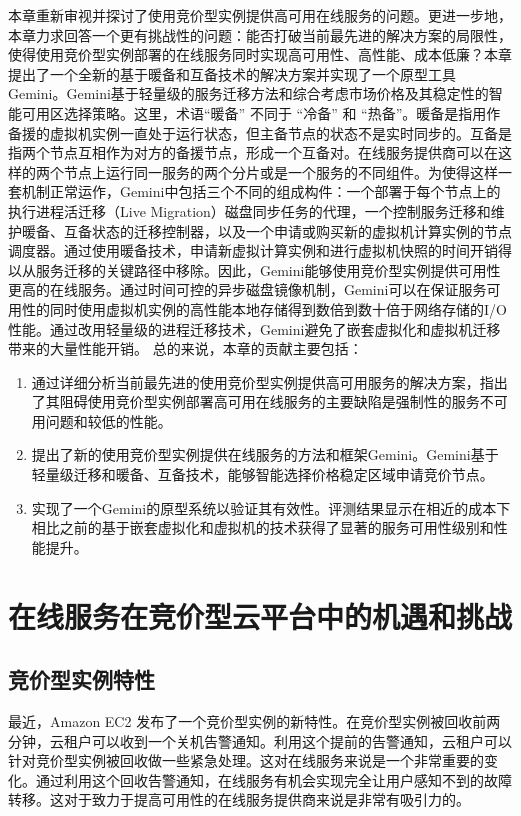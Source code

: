 本章重新审视并探讨了使用竞价型实例提供高可用在线服务的问题。更进一步地，本章力求回答一个更有挑战性的问题：能否打破当前最先进的解决方案的局限性，使得使用竞价型实例部署的在线服务同时实现高可用性、高性能、成本低廉？本章提出了一个全新的基于暖备和互备技术的解决方案并实现了一个原型工具Gemini。Gemini基于轻量级的服务迁移方法和综合考虑市场价格及其稳定性的智能可用区选择策略。这里，术语``暖备'' 不同于 ``冷备'' 和 ``热备''。暖备是指用作备援的虚拟机实例一直处于运行状态，但主备节点的状态不是实时同步的。互备是指两个节点互相作为对方的备援节点，形成一个互备对。在线服务提供商可以在这样的两个节点上运行同一服务的两个分片或是一个服务的不同组件。为使得这样一套机制正常运作，Gemini中包括三个不同的组成构件：一个部署于每个节点上的执行进程活迁移（Live Migration）磁盘同步任务的代理，一个控制服务迁移和维护暖备、互备状态的迁移控制器，以及一个申请或购买新的虚拟机计算实例的节点调度器。通过使用暖备技术，申请新虚拟计算实例和进行虚拟机快照的时间开销得以从服务迁移的关键路径中移除。因此，Gemini能够使用竞价型实例提供可用性更高的在线服务。通过时间可控的异步磁盘镜像机制，Gemini可以在保证服务可用性的同时使用虚拟机实例的高性能本地存储得到数倍到数十倍于网络存储的I/O性能。通过改用轻量级的进程迁移技术，Gemini避免了嵌套虚拟化和虚拟机迁移带来的大量性能开销。
总的来说，本章的贡献主要包括：

\begin{enumerate}
\item 通过详细分析当前最先进的使用竞价型实例提供高可用服务的解决方案，指出了其阻碍使用竞价型实例部署高可用在线服务的主要缺陷是强制性的服务不可用问题和较低的性能。
\item 提出了新的使用竞价型实例提供在线服务的方法和框架Gemini。Gemini基于轻量级迁移和暖备、互备技术，能够智能选择价格稳定区域申请竞价节点。
\item 实现了一个Gemini的原型系统以验证其有效性。评测结果显示在相近的成本下相比之前的基于嵌套虚拟化和虚拟机的技术获得了显著的服务可用性级别和性能提升。
\end{enumerate}

\section{在线服务在竞价型云平台中的机遇和挑战}
\subsection{竞价型实例特性}
最近，Amazon EC2 发布了一个竞价型实例的新特性。在竞价型实例被回收前两分钟，云租户可以收到一个关机告警通知。利用这个提前的告警通知，云租户可以针对竞价型实例被回收做一些紧急处理。这对在线服务来说是一个非常重要的变化。通过利用这个回收告警通知，在线服务有机会实现完全让用户感知不到的故障转移。这对于致力于提高可用性的在线服务提供商来说是非常有吸引力的。

